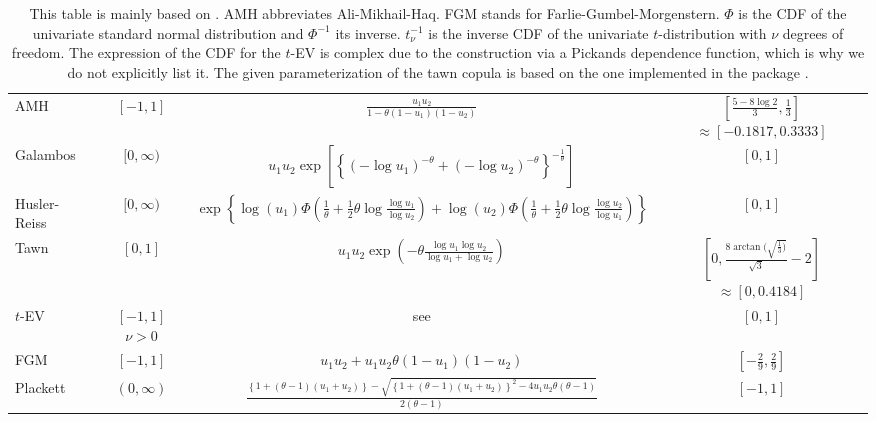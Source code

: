 \begin{appendices}
\begin{table}[H]
\begin{adjustbox}{max width=\textwidth}
\begin{tabular}{lccc}
\vspace{0.35cm}
AMH & $[-1,1]$ & $\frac{u_1 u_2}{1-\theta (1-u_1)(1-u_2)}$ & \makecell{$[\frac{5 - 8 \log 2}{3}, \frac{1}{3}]$\\ $\approx [-0.1817, 0.3333]$}\\
\vspace{0.35cm}
Galambos & $[0,\infty)$ & $u_1 u_2 \exp \left[ \left\{ (-\log u_1)^{-\theta} + (-\log u_2)^{-\theta} \right\}^{-\frac{1}{\theta}}\right]$ & $[0,1]$ \\
\vspace{0.35cm}
Husler-Reiss & $[0,\infty)$ & $\exp \left\{ \log(u_1) \Phi (\frac{1}{\theta} + \frac{1}{2} \theta \log \frac{\log u_1}{\log u_2}) + \log(u_2) \Phi (\frac{1}{\theta} + \frac{1}{2} \theta \log \frac{\log u_2}{\log u_1}) \right\}$ & $[0,1]$\\
\vspace{0.35cm}
Tawn & $[0,1]$ & $u_1 u_2 \exp \left( -\theta \frac{\log u_1 \log u_2}{\log u_1 + \log u_2}\right)$ & \makecell{$[0,\frac{8 \arctan (\sqrt{\frac{1}{3})}}{\sqrt{3}}-2]$\\ $\approx [0,0.4184]$}\\
\vspace{0.35cm}
$t$-EV & \makecell{$[-1,1]$ \\ $\nu > 0$} & see \cite{demarta_mcneil_2004} & $[0,1]$ \\
\vspace{0.35cm}
FGM & $[-1,1]$ & $u_1 u_2 + u_1 u_2 \theta (1-u_1)(1-u_2)$ & $[-\frac{2}{9}, \frac{2}{9}]$\\
\vspace{0.35cm}
Plackett & $(0,\infty)$ & $\frac{ \left\{ 1+(\theta-1)(u_1+u_2)\right\} - \sqrt{\left\{ 1+(\theta -1)(u_1+u_2)\right\}^{2} -4 u_1 u_2 \theta (\theta-1)} }{2(\theta-1)}$ & $[-1,1]$ \\
\bottomrule
\end{tabular}
\end{adjustbox}
\caption{\mycolor This table is mainly based on \cite{michiels2008copula}. AMH abbreviates Ali-Mikhail-Haq. FGM stands for Farlie-Gumbel-Morgenstern. $\Phi$ is the CDF of the univariate standard normal distribution and $\Phi^{-1}$ its inverse. $t_{\nu}^{-1}$ is the inverse CDF of the univariate $t$-distribution with $\nu$ degrees of freedom. The expression of the CDF for the $t$-EV is complex due to the construction via a Pickands dependence function, which is why we do not explicitly list it. The given parameterization of the tawn copula is based on the one implemented in the package .}
\label{tbl:copula_characteristics}
\end{table}


\end{appendices}
